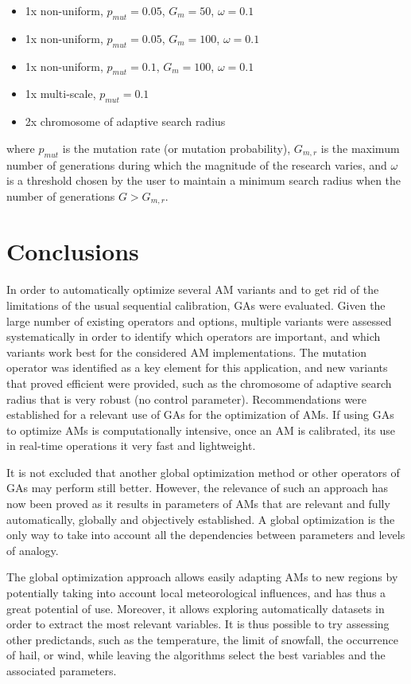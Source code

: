 \documentclass{ametsoc}
\begin{document}
\begin{itemize}
	\setlength\itemsep{-4px}
	\item 1x non-uniform, $p_{mut}=0.05$, $G_{m}=50$, $\omega=0.1$
	\item 1x non-uniform, $p_{mut}=0.05$, $G_{m}=100$, $\omega=0.1$
	\item 1x non-uniform, $p_{mut}=0.1$, $G_{m}=100$, $\omega=0.1$
	\item 1x multi-scale,  $p_{mut}=0.1$
	\item 2x chromosome of adaptive search radius
\end{itemize}

where $p_{mut}$ is the mutation rate (or mutation probability), $G_{m,r}$ is the maximum number of generations during which the magnitude of the research varies, and $\omega$ is a threshold chosen by the user to maintain a minimum search radius when the number of generations $G>G_{m,r}$.


\section{Conclusions}
\label{sec:conclusions}

In order to automatically optimize several AM variants and to get rid of the limitations of the usual sequential calibration, GAs were evaluated. Given the large number of existing operators and options, multiple variants were assessed systematically in order to identify which operators are important, and which variants work best for the considered AM implementations. The mutation operator was identified as a key element for this application, and new variants that proved efficient were provided, such as the chromosome of adaptive search radius that is very robust (no control parameter). Recommendations were established for a relevant use of GAs for the optimization of AMs. If using GAs to optimize AMs is computationally intensive, once an AM is calibrated, its use in real-time operations it very fast and lightweight.

It is not excluded that another global optimization method or other operators of GAs may perform still better. However, the relevance of such an approach has now been proved as it results in parameters of AMs that are relevant and fully automatically, globally and objectively established. A global optimization is the only way to take into account all the dependencies between parameters and levels of analogy.

The global optimization approach allows easily adapting AMs to new regions by potentially taking into account local meteorological influences, and has thus a great potential of use. Moreover, it allows exploring automatically datasets in order to extract the most relevant variables. It is thus possible to try assessing other predictands, such as the temperature, the limit of snowfall, the occurrence of hail, or wind, while leaving the algorithms select the best variables and the associated parameters.
\end{document}
